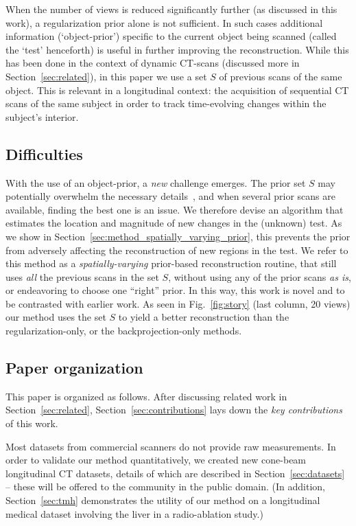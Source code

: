 \documentclass[journal]{IEEEtran}
\begin{document}
 When the number of views is reduced significantly further (as
 discussed in this work), a regularization prior alone is not
 sufficient.  In such cases additional information (`object-prior')
 specific to the current object being scanned (called the `test'
 henceforth) is useful in further improving the reconstruction.  While
 this has been done in the context of dynamic CT-scans (discussed more
 in Section~\ref{sec:related}), in this paper we use a set $S$ of
 previous scans of the same object. This is relevant in a longitudinal
 context: the acquisition of sequential CT scans of the same subject
 in order to track time-evolving changes within the subject's
 interior.
 \subsection{Difficulties}
 
 With the use of an object-prior, a \emph{new} challenge emerges. The prior
 set $S$ may potentially overwhelm the necessary details~\cite{mythesis}, and when
 several prior scans are available, finding the best one is an
 issue. We therefore devise an algorithm that estimates the location
 and magnitude of new changes in the (unknown) test. As we show in
 Section~\ref{sec:method_spatially_varying_prior}, this prevents the prior from adversely affecting the reconstruction of new
 regions in the test. We refer to this method as a
 \textit{spatially-varying} prior-based reconstruction routine, that
 still uses \textit{all} the previous scans in the set $S$, without
 using any of the prior scans \textit{as is}, or endeavoring to choose
 one ``right'' prior. In this way, this work is novel and to be
 contrasted with 
 earlier work. As seen in Fig.~\ref{fig:story} (last column, 20
 views) our method uses the set $S$ to yield a better reconstruction
 than the regularization-only, or the backprojection-only methods.

 \subsection{Paper organization}
 This paper is organized as follows. After discussing related work in
 Section~\ref{sec:related}, Section~\ref{sec:contributions} lays down
 the \emph{key contributions} of this work.
 
Most datasets from commercial scanners do not provide raw
measurements. In order to validate our method quantitatively, we
created new cone-beam longitudinal CT datasets, details of which are
described in Section~\ref{sec:datasets} -- these will be offered to
the community in the public domain.  (In addition,
Section~\ref{sec:tmh} demonstrates the utility of our method on a
longitudinal medical dataset involving the liver in a radio-ablation
study.)
 
\end{document}
